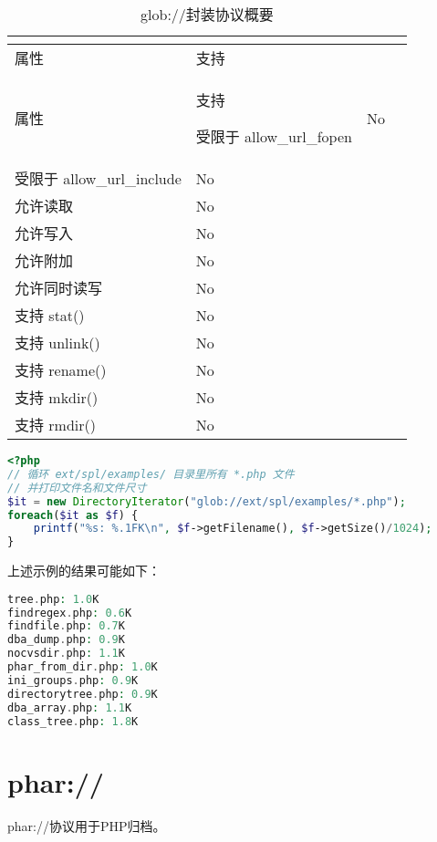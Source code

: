 \begin{longtable}{|m{100pt}|m{150pt}|}
\tabularnewline\hline
属性&支持
\endhead

\caption{glob://封装协议概要}\\
\hline
属性&支持
\endfirsthead

\endfoot

\endlastfoot
\hline
受限于 allow\_url\_fopen&No\\
\hline
受限于 allow\_url\_include&No\\
\hline
允许读取	&No\\
\hline
允许写入	&No\\
\hline
允许附加	&No\\
\hline
允许同时读写	&No\\
\hline
支持 stat()	&No\\
\hline
支持 unlink()	&No\\
\hline
支持 rename()	&No\\
\hline
支持 mkdir()	&No\\
\hline
支持 rmdir()	&No\\
\hline
\end{longtable}

\begin{lstlisting}[language=PHP]
<?php
// 循环 ext/spl/examples/ 目录里所有 *.php 文件
// 并打印文件名和文件尺寸
$it = new DirectoryIterator("glob://ext/spl/examples/*.php");
foreach($it as $f) {
    printf("%s: %.1FK\n", $f->getFilename(), $f->getSize()/1024);
}
\end{lstlisting}


上述示例的结果可能如下：

\begin{lstlisting}[language=PHP]
tree.php: 1.0K
findregex.php: 0.6K
findfile.php: 0.7K
dba_dump.php: 0.9K
nocvsdir.php: 1.1K
phar_from_dir.php: 1.0K
ini_groups.php: 0.9K
directorytree.php: 0.9K
dba_array.php: 1.1K
class_tree.php: 1.8K
\end{lstlisting}


\section{phar://}

phar://协议用于PHP归档。


